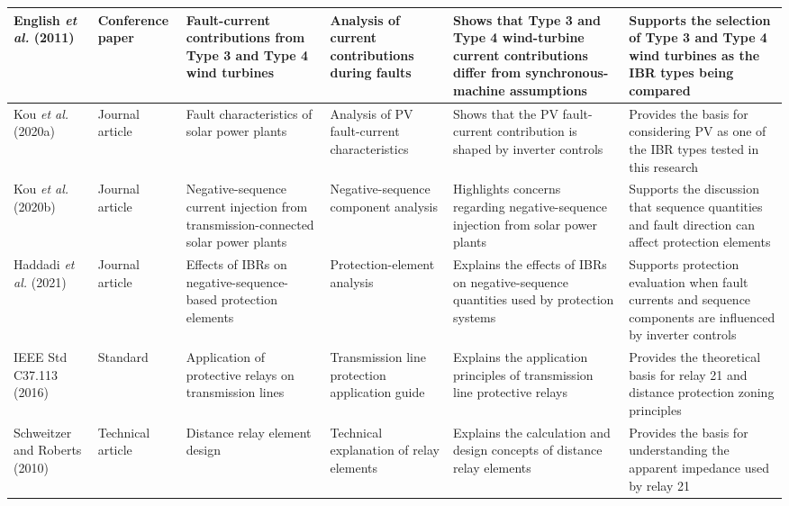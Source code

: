 \begin{longtable}{|p{}|p{}|p{}|p{}|p{}|p{}|}
    English \textit{et al.} (2011) \cite{english2011current_contributions} & Conference paper & Fault-current contributions from Type 3 and Type 4 wind turbines & Analysis of current contributions during faults & Shows that Type 3 and Type 4 wind-turbine current contributions differ from synchronous-machine assumptions & Supports the selection of Type 3 and Type 4 wind turbines as the IBR types being compared \\ \hline

    Kou \textit{et al.} (2020a) \cite{kou2020fault} & Journal article & Fault characteristics of solar power plants & Analysis of PV fault-current characteristics & Shows that the PV fault-current contribution is shaped by inverter controls & Provides the basis for considering PV as one of the IBR types tested in this research \\ \hline

    Kou \textit{et al.} (2020b) \cite{kou2020negative_sequence} & Journal article & Negative-sequence current injection from transmission-connected solar power plants & Negative-sequence component analysis & Highlights concerns regarding negative-sequence injection from solar power plants & Supports the discussion that sequence quantities and fault direction can affect protection elements \\ \hline

    Haddadi \textit{et al.} (2021) \cite{haddadi2021negative_sequence_elements} & Journal article & Effects of IBRs on negative-sequence-based protection elements & Protection-element analysis & Explains the effects of IBRs on negative-sequence quantities used by protection systems & Supports protection evaluation when fault currents and sequence components are influenced by inverter controls \\ \hline

    IEEE Std C37.113 (2016) \cite{ieee2016c37113} & Standard & Application of protective relays on transmission lines & Transmission line protection application guide & Explains the application principles of transmission line protective relays & Provides the theoretical basis for relay 21 and distance protection zoning principles \\ \hline

    Schweitzer and Roberts (2010) \cite{schweitzer2010distance_relay_element_design} & Technical article & Distance relay element design & Technical explanation of relay elements & Explains the calculation and design concepts of distance relay elements & Provides the basis for understanding the apparent impedance used by relay 21 \\ \hline


\end{longtable}
